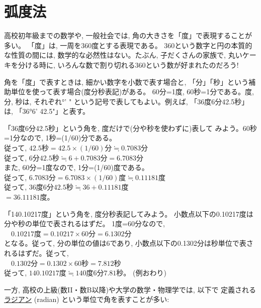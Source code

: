 \section{弧度法}

高校初年級までの数学や, 一般社会では, 角の大きさを「度」で表現することが多い。
「度」は, 一周を360度とする表現である。
360という数字と円の本質的な性質の間には, 数学的な必然性はない。たぶん, 子だくさんの家族で, 
丸いケーキを分ける時に, いろんな数で割り切れる360という数が好まれたのだろう!

角を「度」で表すときは, 細かい数字を小数で表す場合と, 
「分」「秒」という補助単位を使って表す場合(度分秒表記)がある。
60分=1度, 60秒=1分である。度, 分, 秒は, それぞれ°' "
という記号で表してもよい。例えば, 「36度6分42.5秒」は, 「36°6' 42.5"」と表す。

\begin{exmpl} 「36度6分42.5秒」という角を, 度だけで(分や秒を使わずに)表して
みよう。60秒=1分なので, 1秒=(1/60)分である。\\
従って, $42.5\text{秒}=42.5\times(1/60)\text{分}\fallingdotseq0.7083\text{分}$\\
従って, $6\text{分}42.5\text{秒}\fallingdotseq6+0.7083\text{分}=6.7083\text{分}$\\
また, 60分=1度なので, 1分=(1/60)度である。\\
従って, $6.7083\text{分}=6.7083\times(1/60)\text{度}\fallingdotseq0.11181\text{度}$\\
従って, $36\text{度}6\text{分}42.5\text{秒}\fallingdotseq36+0.11181\text{度}$\\$=36.11181\text{度}$。
\end{exmpl}

\begin{exmpl} 「140.10217度」という角を, 度分秒表記してみよう。
小数点以下の0.10217度は分や秒の単位で表されるはずだ。
1度=60分なので,\\
$\quad0.10217\text{度}=0.10217\times 60\text{分}=6.1302\text{分}$\\
となる。従って, 分の単位の値は6であり, 小数点以下の0.1302分は秒単位で表されるはずだ。従って,\\
$\quad0.1302\text{分}=0.1302\times 60\text{秒}=7.812\text{秒}$\\
従って, $140.10217\text{度}\fallingdotseq140\text{度}6\text{分}7.81\text{秒}$。
(例おわり)
\end{exmpl}
\mv

一方, 高校の上級(数II・数B以降)や大学の数学・物理学では, 以下で
定義される\underline{ラジアン} (radian)
という単位で角を表すことが多い:\hv

